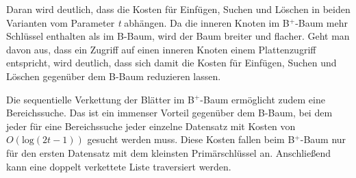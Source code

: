 Daran wird deutlich, dass die Kosten für Einfügen, Suchen und Löschen in beiden Varianten vom Parameter \textit{t} abhängen. Da die inneren Knoten im B$^+$-Baum mehr Schlüssel enthalten als im B-Baum, wird der Baum breiter und flacher. Geht man davon aus, dass ein Zugriff auf einen inneren Knoten einem Plattenzugriff entspricht, wird deutlich, dass sich damit die Kosten für Einfügen, Suchen und Löschen gegenüber dem B-Baum reduzieren lassen.

Die sequentielle Verkettung der Blätter im B$^+$-Baum ermöglicht zudem eine Bereichssuche. Das ist ein immenser Vorteil gegenüber dem B-Baum, bei dem jeder für eine Bereichssuche jeder einzelne Datensatz mit Kosten von $O(\text{log} (2t -1))$ gesucht werden muss. Diese Kosten fallen beim B$^+$-Baum nur für den ersten Datensatz mit dem kleinsten Primärschlüssel an. Anschließend kann eine doppelt verkettete Liste traversiert werden. 
